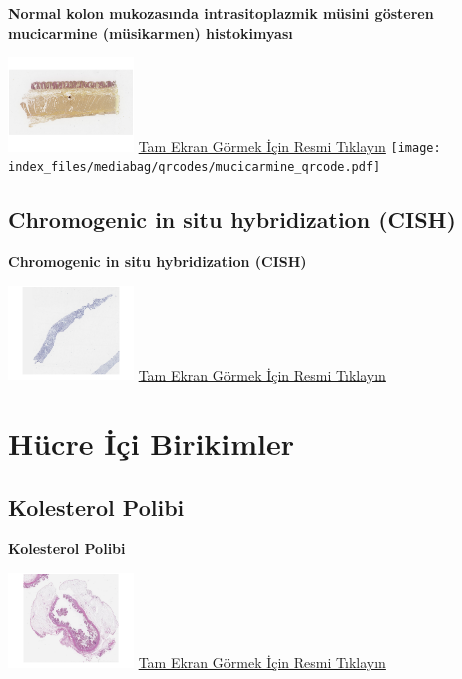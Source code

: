 \documentclass[
  letterpaper,
  DIV=11,
  numbers=noendperiod]{scrreprt}
\begin{document}
\textbf{Normal kolon mukozasında intrasitoplazmik müsini gösteren
mucicarmine (müsikarmen) histokimyası}

\href{https://images.patolojiatlasi.com/mucin/mucicarmine.html}{\includegraphics[width=0.25\textwidth,height=\textheight]{./screenshots/mucicarmine_screenshot.png}}
\href{https://images.patolojiatlasi.com/mucin/mucicarmine.html}{Tam
Ekran Görmek İçin Resmi Tıklayın}
\texttt{[image: index\_files/mediabag/qrcodes/mucicarmine\_qrcode.pdf]}

\hypertarget{sec-chromogenic-in-situ-hybridization-cish}{%
\section{Chromogenic in situ hybridization
(CISH)}\label{sec-chromogenic-in-situ-hybridization-cish}}

\textbf{Chromogenic in situ hybridization (CISH)}

\href{https://images.patolojiatlasi.com/her2-cish/cish.html}{\includegraphics[width=0.25\textwidth,height=\textheight]{./screenshots/cish_screenshot.png}}
\href{https://images.patolojiatlasi.com/her2-cish/cish.html}{Tam Ekran
Görmek İçin Resmi Tıklayın}

\hypertarget{sec-hucre-ici-birikimler}{%
\chapter{Hücre İçi Birikimler}\label{sec-hucre-ici-birikimler}}

\hypertarget{sec-kolesterol-polibi}{%
\section{Kolesterol Polibi}\label{sec-kolesterol-polibi}}

\textbf{Kolesterol Polibi}

\href{https://images.patolojiatlasi.com/cholesterolpolyp/HE.html}{\includegraphics[width=0.25\textwidth,height=\textheight]{./screenshots/cholesterolpolyp_screenshot.png}}
\href{https://images.patolojiatlasi.com/cholesterolpolyp/HE.html}{Tam
Ekran Görmek İçin Resmi Tıklayın}
\end{document}
